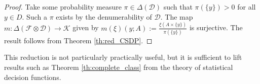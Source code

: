\begin{proof}
Take some probability measure $\pi\in \Delta(\mathcal{D})$ such that $\pi(\{y\})>0$ for all $y\in D$. Such a $\pi$ exists by the denumerability of $\mathcal{D}$. The map $m:\Delta(\mathcal{F}\otimes\mathcal{D})\to \mathscr{K}$ given by $m(\xi)(y;A) := \frac{\xi(A\times\{y\})}{\pi(\{y\})}$ is surjective. The result follows from Theorem \ref{th:red_CSDP}.
\end{proof}

This reduction is not particularly practically useful, but it is sufficient to lift results such as Theorem \ref{th:complete_class} from the theory of statistical decision functions.

